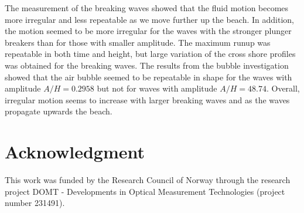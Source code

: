 \documentclass[a4paper, 11pt, english, twoside, openright]{article}
\begin{document}
The measurement of the breaking waves showed that the fluid motion becomes more irregular and less repeatable as we move further up the beach. In addition, the motion seemed to be more irregular for the waves with the stronger plunger breakers than for those with smaller amplitude. The maximum runup was repeatable in both time and height, but large variation of the cross shore profiles was obtained for the breaking waves. The results from the bubble investigation showed that the air bubble seemed to be repeatable in shape for the waves with amplitude $A/H=0.2958$ but not for waves with amplitude  $A/H=48.74$. Overall, irregular motion seems to increase with larger breaking waves and as the waves propagate upwards the beach.  

\section*{Acknowledgment}

This work was funded by the Research Council of Norway through the research project DOMT - Developments in Optical Measurement Technologies (project number 231491).
 

\end{document}
